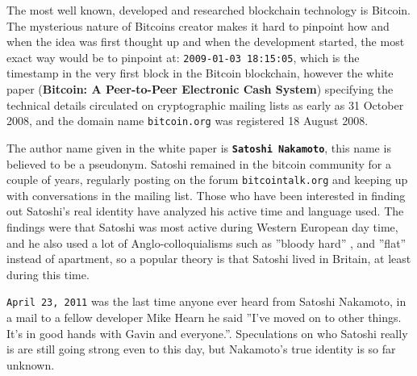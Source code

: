 The most well known, developed and researched blockchain technology is Bitcoin.
The mysterious nature of Bitcoins creator makes it hard to pinpoint how
and when the idea was first thought up and when the development started, the
most exact way would be to pinpoint at:
\texttt{2009-01-03 18:15:05}, which is the timestamp in the very
first block in the Bitcoin blockchain, however the white paper (\textbf{Bitcoin:
A Peer-to-Peer Electronic Cash System})\cite{genesis}\cite{nakamoto_bitcoin} specifying the
technical details circulated on cryptographic mailing lists as early as 31
October 2008, and the domain name \texttt{bitcoin.org} was registered 18 August
2008.\cite{bernard_2018}


The author name given in the white paper is \textbf{\texttt{Satoshi Nakamoto}},
this name is believed to be a pseudonym. Satoshi remained in the bitcoin
community for a couple of years, regularly posting on the forum
\texttt{bitcointalk.org} and keeping up with conversations in the mailing list.
Those who have been interested in finding out Satoshi's real identity have
analyzed his active time and language used. The findings were that Satoshi was
most active during Western European day time, and he also used a lot of
Anglo-colloquialisms such as ''bloody hard'' \cite{nakamoto_bloody}, and
''flat'' instead of apartment, so a popular theory is that Satoshi lived in
Britain, at least during this time.\cite{bernard_2018}

\texttt{April 23, 2011} was the last time anyone ever heard from Satoshi
Nakamoto, in a mail to a fellow developer Mike Hearn he said ''I've moved on to
other things.  It's in good hands with Gavin and everyone.''.\cite{nakamoto_last_mail}
Speculations on who Satoshi really is are still going strong even to this day, but
Nakamoto's true identity is so far unknown.\cite{bernard_2018}\cite{jeffries_2013}
